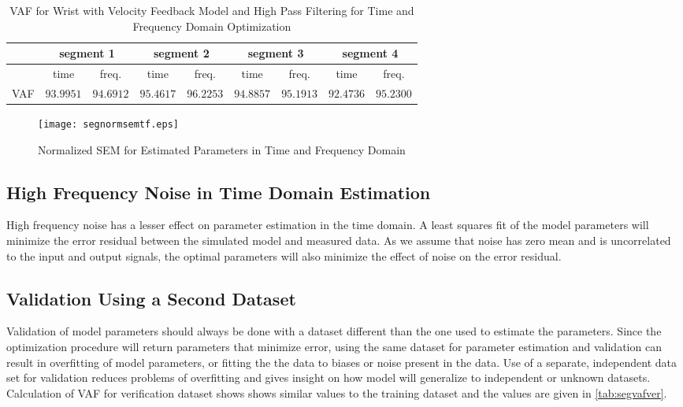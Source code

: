\documentclass[11pt,a4paper]{article}
\begin{document}
\begin{table}
    \centering
    \begin{tabular}{|l|r|r|r|r|r|r|r|r|}
        \hline
        \nonumber &
            \multicolumn{2}{c|}{segment 1} &
            \multicolumn{2}{c|}{segment 2} &
            \multicolumn{2}{c|}{segment 3} &
            \multicolumn{2}{c|}{segment 4} \\
        \hline
        \nonumber &
            \multicolumn{1}{c|}{time} & \multicolumn{1}{c|}{freq.} &
            \multicolumn{1}{c|}{time} & \multicolumn{1}{c|}{freq.} &
            \multicolumn{1}{c|}{time} & \multicolumn{1}{c|}{freq.} &
            \multicolumn{1}{c|}{time} & \multicolumn{1}{c|}{freq.} \\
        \hline
        VAF &
            $93.9951$ & $94.6912$ & $95.4617$ & $96.2253$ &
            $94.8857$ & $95.1913$ & $92.4736$ & $95.2300$ \\
        \hline
    \end{tabular}
    \caption{VAF for Wrist with Velocity Feedback Model and High Pass
        Filtering for Time and Frequency Domain Optimization}
    \label{tab:segvafhp}
\end{table}

\begin{figure}
    \centering
    \texttt{[image: segnormsemtf.eps]}
    \caption{Normalized SEM for Estimated Parameters in Time and Frequency
        Domain}
    \label{fig:segnormsemtf}
\end{figure}

\subsection{High Frequency Noise in Time Domain Estimation}
High frequency noise has a lesser effect on parameter estimation in the time
domain. A least squares fit of the model parameters will minimize the error
residual between the simulated model and measured data. As we assume that noise
has zero mean and is uncorrelated to the input and output signals, the optimal
parameters will also minimize the effect of noise on the error residual.

\subsection{Validation Using a Second Dataset}
Validation of model parameters should always be done with a dataset different
than the one used to estimate the parameters. Since the optimization procedure
will return parameters that minimize error, using the same dataset for
parameter estimation and validation can result in overfitting of model
parameters, or fitting the the data to biases or noise present in the data. Use
of a separate, independent data set for validation reduces problems of
overfitting and gives insight on how model will generalize to independent or
unknown datasets. Calculation of VAF for verification dataset shows shows
similar values to the training dataset and the values are given in
\autoref{tab:segvafver}.
\end{document}

